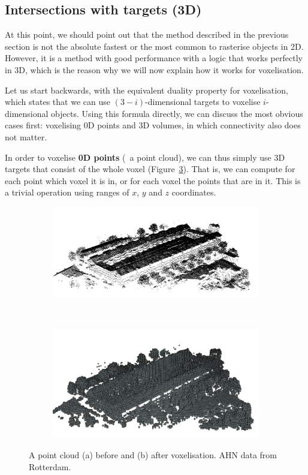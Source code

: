 \subsection{Intersections with targets (3D)}

At this point, we should point out that the method described in the previous section is not the absolute fastest or the most common to rasterise objects in 2D.
However, it is a method with good performance with a logic that works perfectly in 3D, which is the reason why we will now explain how it works for voxelisation.

Let us start backwards, with the equivalent duality property for voxelisation, which states that we can use \((3-i)\)-dimensional targets to voxelise \(i\)-dimensional objects.
Using this formula directly, we can discuss the most obvious cases first: voxelising 0D points and 3D volumes, in which connectivity also does not matter.

In order to voxelise \textbf{0D points} (\eg\ a point cloud), we can thus simply use 3D targets that consist of the whole voxel (Figure~\ref{fig:points}).
That is, we can compute for each point which voxel it is in, or for each voxel the points that are in it.
This is a trivial operation using ranges of \(x\), \(y\) and \(z\) coordinates.

\begin{figure}
\centering
\begin{subfigure}[b]{\linewidth}
\includegraphics[width=\linewidth]{figs/points-pre}
\caption{}%
\label{subfig:points-pre}
\end{subfigure}
\\
\begin{subfigure}[b]{\linewidth}
\includegraphics[width=\linewidth]{figs/points-post}
\caption{}%
\label{subfig:points-post}
\end{subfigure}
\caption{A point cloud (a) before and (b) after voxelisation. AHN data from Rotterdam.}%
\label{fig:points}
\end{figure}

